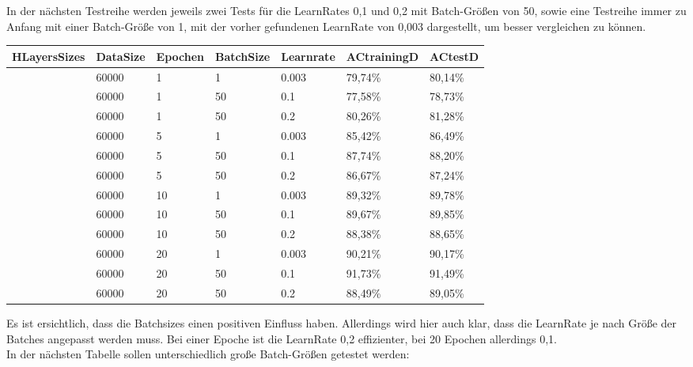 \documentclass[12pt]{article}
\begin{document}
In der nächsten Testreihe werden jeweils zwei Tests für die LearnRates 0,1 und 0,2 mit Batch-Größen von 50, sowie eine Testreihe immer zu Anfang mit einer Batch-Größe von 1, mit der vorher gefundenen LearnRate von 0,003 dargestellt, um besser vergleichen zu können. 

\begin{table}[H]
    \centering
    \begin{tabular}{|l|l|l|l|l|l|l|}
    \hline
        HLayersSizes & DataSize & Epochen & BatchSize & Learnrate & ACtrainingD & ACtestD \\ \hline
        [784, 100, 10] & 60000 & 1 & 1 & 0.003 & 79,74\% & 80,14\% \\ \hline
        [784, 100, 10] & 60000 & 1 & 50 & 0.1 & 77,58\% & 78,73\% \\ \hline
        [784, 100, 10] & 60000 & 1 & 50 & 0.2 & 80,26\% & 81,28\% \\ \hline
        [784, 100, 10] & 60000 & 5 & 1 & 0.003 & 85,42\% & 86,49\% \\ \hline
        [784, 100, 10] & 60000 & 5 & 50 & 0.1 & 87,74\% & 88,20\% \\ \hline
        [784, 100, 10] & 60000 & 5 & 50 & 0.2 & 86,67\% & 87,24\% \\ \hline
        [784, 100, 10] & 60000 & 10 & 1 & 0.003 & 89,32\% & 89,78\% \\ \hline
        [784, 100, 10] & 60000 & 10 & 50 & 0.1 & 89,67\% & 89,85\% \\ \hline
        [784, 100, 10] & 60000 & 10 & 50 & 0.2 & 88,38\% & 88,65\% \\ \hline
        [784, 100, 10] & 60000 & 20 & 1 & 0.003 & 90,21\% & 90,17\% \\ \hline
        [784, 100, 10] & 60000 & 20 & 50 & 0.1 & 91,73\% & 91,49\% \\ \hline
        [784, 100, 10] & 60000 & 20 & 50 & 0.2 & 88,49\% & 89,05\% \\ \hline
    \end{tabular}
\end{table}
Es ist ersichtlich, dass die Batchsizes einen positiven Einfluss haben. Allerdings wird hier auch klar, dass die LearnRate je nach Größe der Batches angepasst werden muss. Bei einer Epoche ist die LearnRate 0,2 effizienter, bei 20 Epochen allerdings 0,1. \\
In der nächsten Tabelle sollen unterschiedlich große Batch-Größen getestet werden: 
\end{document}
